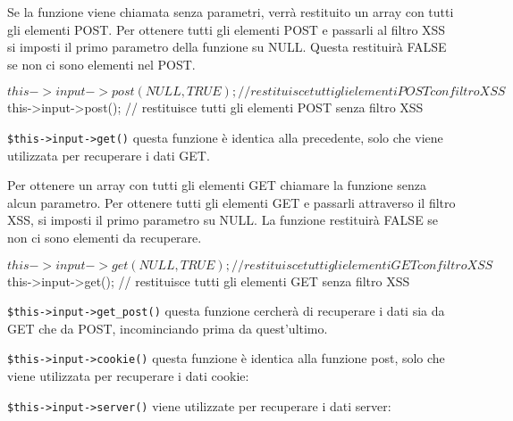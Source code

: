 
Se la funzione viene chiamata senza parametri, verrà restituito un array con tutti gli elementi POST. Per ottenere tutti gli elementi POST e passarli al filtro \ac{XSS} si imposti il primo parametro della funzione su NULL. Questa restituirà FALSE se non ci sono elementi nel POST.

\begin{code}
$this->input->post(NULL, TRUE); // restituisce tutti gli elementi POST con filtro XSS
$this->input->post(); // restituisce tutti gli elementi POST senza filtro XSS
\end{code}

\verb|$this->input->get()| questa funzione è identica alla precedente, solo che viene utilizzata per recuperare i dati GET.


Per ottenere un array con tutti gli elementi GET chiamare la funzione senza alcun parametro. Per ottenere tutti gli elementi GET e passarli attraverso il filtro \ac{XSS}, si imposti il primo parametro su NULL. La funzione restituirà FALSE se non ci sono elementi da recuperare.

\begin{code}
$this->input->get(NULL, TRUE); // restituisce tutti gli elementi GET con filtro XSS
$this->input->get(); // restituisce tutti gli elementi GET senza filtro XSS
\end{code}

\verb|$this->input->get_post()| questa funzione cercherà di recuperare i dati sia da GET che da POST, incominciando prima da quest'ultimo.


\verb|$this->input->cookie()| questa funzione è identica alla funzione post, solo che viene utilizzata per recuperare i dati cookie:


\verb|$this->input->server()| viene utilizzate per recuperare i dati server:

